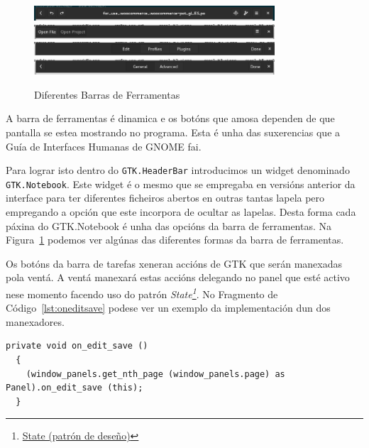 \begin{figure}[h!]
  \centering
    \includegraphics[width=0.8\textwidth]{img/editheaderbar.png}
    \includegraphics[width=0.8\textwidth]{img/openedfilesheaderbar.png}
    \includegraphics[width=0.8\textwidth]{img/preferencesheaderbar.png}
    \includegraphics[width=0.8\textwidth]{img/profileheaderbar.png}
    \caption{Diferentes Barras de Ferramentas}
    \label{fig:ui:v3:headerbar}
\end{figure}

A barra de ferramentas é dinamica e os botóns que amosa dependen de que pantalla se estea mostrando no programa. Esta é unha das suxerencias que a Guía de Interfaces Humanas de GNOME fai.

Para lograr isto dentro do \lstinline{GTK.HeaderBar} introducimos un widget denominado \lstinline{GTK.Notebook}. Este widget é o mesmo que se empregaba en versións anterior da interface para ter diferentes ficheiros abertos en outras tantas lapela pero empregando a opción que este incorpora de ocultar as lapelas. Desta forma cada páxina do GTK.Notebook é unha das opcións da barra de ferramentas. Na Figura~\ref{fig:ui:v3:headerbar} podemos ver algúnas das diferentes formas da barra de ferramentas.

Os botóns da barra de tarefas xeneran accións de GTK que serán manexadas pola ventá. A ventá manexará estas accións delegando no panel que esté activo nese momento facendo uso do patrón \emph{State\footnote{\href{http://gl.wikipedia.org/wiki/State_\%28patr\%C3\%B3n_de_dese\%C3\%B1o\%29}{State (patrón de deseño)}}}. No Fragmento de Código~\ref{lst:oneditsave} podese ver un exemplo da implementación dun dos manexadores.

\lstset{language=[sharp]C}
\begin{lstlisting}[label=lst:oneditsave,caption=Implemenación do manexador da acción gardar]
  private void on_edit_save ()
  {
    (window_panels.get_nth_page (window_panels.page) as Panel).on_edit_save (this);
  }
\end{lstlisting}


